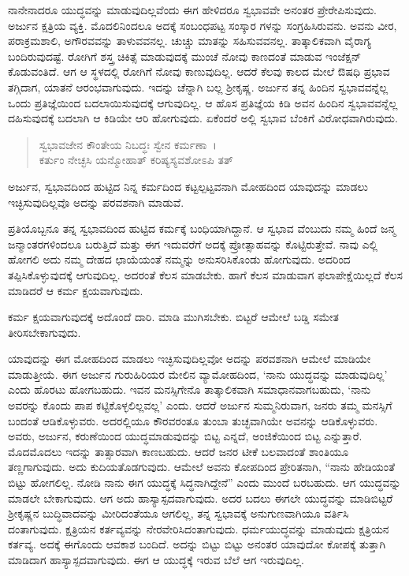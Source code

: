 ನಾನೇನಾದರೂ ಯುದ್ಧವನ್ನು ಮಾಡುವುದಿಲ್ಲವೆಂದು ಈಗ ಹೇಳಿದರೂ ಸ್ವಭಾವವೇ ಅನಂತರ ಪ್ರೇರೇಪಿಸುವುದು. ಅರ್ಜುನ ಕ್ಷತ್ರಿಯ ವ್ಯಕ್ತಿ. ಮೊದಲಿನಿಂದಲೂ ಅದಕ್ಕೆ ಸಂಬಂಧಪಟ್ಟ ಸಂಸ್ಕಾರ ಗಳನ್ನು ಸಂಗ್ರಹಿಸಿರುವನು. ಅವನು ವೀರ, ಪರಾಕ್ರಮಶಾಲಿ, ಅಗೌರವವನ್ನು ತಾಳುವವನಲ್ಲ. ಚುಚ್ಚು ಮಾತನ್ನು ಸಹಿಸುವವನಲ್ಲ. ತಾತ್ಕಾಲಿಕವಾಗಿ ವೈರಾಗ್ಯ ಬಂದಿರುವುದಷ್ಟೆ. ರೋಗಿಗೆ ಶಸ್ತ್ರ ಚಿಕಿತ್ಸೆ ಮಾಡುವುದಕ್ಕೆ ಮುಂಚೆ ನೋವು ಕಾಣದಂತೆ ಮಾಡುವ ಇಂಜೆಕ್ಷನ್ ಕೊಡುವಂತಿದೆ. ಆಗ ಆ ಸ್ಥಳದಲ್ಲಿ ರೋಗಿಗೆ ನೋವು ಕಾಣುವುದಿಲ್ಲ. ಆದರೆ ಕೆಲವು ಕಾಲದ ಮೇಲೆ ಔಷಧಿ ಪ್ರಭಾವ ತಗ್ಗಿದಾಗ, ಯಾತನೆ ಆರಂಭವಾಗುವುದು. ಇದನ್ನು ಚೆನ್ನಾಗಿ ಬಲ್ಲ ಶ‍್ರೀಕೃಷ್ಣ. ಅರ್ಜುನ ತನ್ನ ಹಿಂದಿನ ಸ್ವಭಾವವನ್ನೆಲ್ಲ ಒಂದು ಪ್ರತಿಜ್ಞೆಯಿಂದ ಬದಲಾಯಿಸುವುದಕ್ಕೆ ಆಗುವುದಿಲ್ಲ. ಆ ಹೊಸ ಪ್ರತಿಜ್ಞೆಯ ಕಿಡಿ ಅವನ ಹಿಂದಿನ ಸ್ವಭಾವವನ್ನೆಲ್ಲ ದಹಿಸುವುದಕ್ಕೆ ಬದಲಾಗಿ ಆ ಕಿಡಿಯೇ ಆರಿ ಹೋಗುವುದು. ಏಕೆಂದರೆ ಅಲ್ಲಿ ಸ್ವಭಾವ ಬೆಂಕಿಗೆ ವಿರೋಧವಾಗಿರುವುದು.

\begin{verse}
ಸ್ವಭಾವಜೇನ ಕೌಂತೇಯ ನಿಬದ್ಧಃ ಸ್ವೇನ ಕರ್ಮಣಾ~।\\ಕರ್ತುಂ ನೇಚ್ಛಸಿ ಯನ್ಮೋಹಾತ್ ಕರಿಷ್ಯಸ್ಯವಶೋಽಪಿ ತತ್ 
\end{verse}

{\small ಅರ್ಜುನ, ಸ್ವಭಾವದಿಂದ ಹುಟ್ಟಿದ ನಿನ್ನ ಕರ್ಮದಿಂದ ಕಟ್ಟಲ್ಪಟ್ಟವನಾಗಿ ಮೋಹದಿಂದ ಯಾವುದನ್ನು ಮಾಡಲು ಇಚ್ಛಿಸುವುದಿಲ್ಲವೊ ಅದನ್ನು ಪರವಶನಾಗಿ ಮಾಡುವೆ.}

ಪ್ರತಿಯೊಬ್ಬನೂ ತನ್ನ ಸ್ವಭಾವದಿಂದ ಹುಟ್ಟಿದ ಕರ್ಮಕ್ಕೆ ಬಂಧಿಯಾಗಿದ್ದಾನೆ. ಆ ಸ್ವಭಾವ ವೆಂಬುದು ನಮ್ಮ ಹಿಂದೆ ಜನ್ಮ ಜನ್ಮಾಂತರಗಳಿಂದಲೂ ಬರುತ್ತಿದೆ ಮತ್ತು ಈಗ ಇದುವರೆಗೆ ಅದಕ್ಕೆ ಪ್ರೋತ್ಸಾಹವನ್ನು ಕೊಟ್ಟಿರುತ್ತೇವೆ. ನಾವು ಎಲ್ಲಿ ಹೋಗಲಿ ಅದು ನಮ್ಮ ದೇಹದ ಛಾಯೆಯಂತೆ ನಮ್ಮನ್ನು ಅನುಸರಿಸಿಕೊಂಡು ಹೋಗುವುದು. ಅದರಿಂದ ತಪ್ಪಿಸಿಕೊಳ್ಳುವುದಕ್ಕೆ ಆಗುವುದಿಲ್ಲ. ಅದರಂತೆ ಕೆಲಸ ಮಾಡಬೇಕು. ಹಾಗೆ ಕೆಲಸ ಮಾಡುವಾಗ ಫಲಾಪೇಕ್ಷೆಯಿಲ್ಲದೆ ಕೆಲಸ ಮಾಡಿದರೆ ಆ ಕರ್ಮ ಕ್ಷಯವಾಗುವುದು.

ಕರ್ಮ ಕ್ಷಯವಾಗುವುದಕ್ಕೆ ಅದೊಂದೆ ದಾರಿ. ಮಾಡಿ ಮುಗಿಸಬೇಕು. ಬಿಟ್ಟರೆ ಆಮೇಲೆ ಬಡ್ಡಿ ಸಮೇತ ತೀರಿಸಬೇಕಾಗುವುದು.

ಯಾವುದನ್ನು ಈಗ ಮೋಹದಿಂದ ಮಾಡಲು ಇಚ್ಛಿಸುವುದಿಲ್ಲವೋ ಅದನ್ನು ಪರವಶನಾಗಿ ಆಮೇಲೆ ಮಾಡಿಯೇ ಮಾಡುತ್ತೀಯೆ. ಈಗ ಅರ್ಜುನ ಗುರುಹಿರಿಯರ ಮೇಲಿನ ವ್ಯಾಮೋಹದಿಂದ, ‘ನಾನು ಯುದ್ಧವನ್ನು ಮಾಡುವುದಿಲ್ಲ’ ಎಂದು ಹೊರಟು ಹೋಗಬಹುದು. ಇವನ ಮನಸ್ಸಿಗೇನೊ ತಾತ್ಕಾಲಿಕವಾಗಿ ಸಮಾಧಾನವಾಗಬಹುದು, ‘ನಾನು ಅವರನ್ನು ಕೊಂದು ಪಾಪ ಕಟ್ಟಿಕೊಳ್ಳಲಿಲ್ಲವಲ್ಲ’ ಎಂದು. ಆದರೆ ಅರ್ಜುನ ಸುಮ್ಮನಿರುವಾಗ, ಜನರು ತಮ್ಮ ಮನಸ್ಸಿಗೆ ಬಂದಂತೆ ಆಡಿಕೊಳ್ಳುವರು. ಅದರಲ್ಲಿಯೂ ಕೌರವರಂತೂ ತುಂಬಾ ತುಚ್ಛವಾಗಿಯೇ ಅವನನ್ನು ಆಡಿಕೊಳ್ಳುವರು. ಅವರು, ಅರ್ಜುನ, ಕರುಣೆಯಿಂದ ಯುದ್ಧಮಾಡುವುದನ್ನು ಬಿಟ್ಟ ಎನ್ನದೆ, ಅಂಜಿಕೆಯಿಂದ ಬಿಟ್ಟ ಎನ್ನುತ್ತಾರೆ. ಮೊದಮೊದಲು ಇದನ್ನು ತಾತ್ಸಾರವಾಗಿ ಕಾಣಬಹುದು. ಆದರೆ ಜನರ ಟೀಕೆ ಬಲವಾದಂತೆ ಶಾಂತಿಯೂ ತಣ್ಣಗಾಗುವುದು. ಅದು ಕುದಿಯತೊಡಗುವುದು. ಆಮೇಲೆ ಅವನು ಕೋಪದಿಂದ ಪ್ರೇರಿತನಾಗಿ, “ನಾನು ಹೇಡಿಯಂತೆ ಬಿಟ್ಟು ಹೋಗಲಿಲ್ಲ. ನೋಡಿ ನಾನು ಈಗ ಯುದ್ಧಕ್ಕೆ ಸಿದ್ಧನಾಗಿದ್ದೇನೆ” ಎಂದು ಮುಂದೆ ಬರಬಹುದು. ಆಗ ಯುದ್ಧವನ್ನು ಮಾಡಲೇ ಬೇಕಾಗುವುದು. ಆಗ ಅದು ಹಾಸ್ಯಾಸ್ಪದವಾಗುವುದು. ಅದರ ಬದಲು ಈಗಲೇ ಯುದ್ಧವನ್ನು ಮಾಡಿಬಿಟ್ಟರೆ ಶ‍್ರೀಕೃಷ್ಣನ ಬುದ್ಧಿವಾದವನ್ನು ಮೀರಿದಂತೆಯೂ ಆಗಲಿಲ್ಲ, ತನ್ನ ಸ್ವಭಾವಕ್ಕೆ ಅನುಗುಣವಾಗಿಯೂ ವರ್ತಿಸಿ ದಂತಾಗುವುದು. ಕ್ಷತ್ರಿಯನ ಕರ್ತವ್ಯವನ್ನು ನೇರವೇರಿಸಿದಂತಾಗುವುದು. ಧರ್ಮಯುದ್ಧವನ್ನು ಮಾಡುವುದು ಕ್ಷತ್ರಿಯನ ಕರ್ತವ್ಯ. ಅದಕ್ಕೆ ಈಗೊಂದು ಆವಕಾಶ ಬಂದಿದೆ. ಅದನ್ನು ಬಿಟ್ಟು ಬಿಟ್ಟು ಅನಂತರ ಯಾವುದೋ ಕೋಪಕ್ಕೆ ತುತ್ತಾಗಿ ಮಾಡಿದಾಗ ಹಾಸ್ಯಾಸ್ಪದವಾಗುವುದು. ಈಗ ಆ ಯುದ್ಧಕ್ಕೆ ಇರುವ ಬೆಲೆ ಆಗ ಇರುವುದಿಲ್ಲ.

